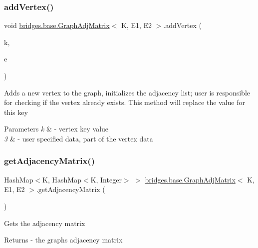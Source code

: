 \subsubsection{\texorpdfstring{addVertex()}{addVertex()}}
{\footnotesize\ttfamily void \mbox{\hyperlink{classbridges_1_1base_1_1_graph_adj_matrix}{bridges.\+base.\+Graph\+Adj\+Matrix}}$<$ K, E1, E2 $>$.add\+Vertex (\begin{DoxyParamCaption}\item[{K}]{k,  }\item[{E1}]{e }\end{DoxyParamCaption})}

Adds a new vertex to the graph, initializes the adjacency list; user is responsible for checking if the vertex already exists. This method will replace the value for this key


\begin{DoxyParams}{Parameters}
{\em k} & -\/ vertex key value \\
\hline
{\em 3} & -\/ user specified data, part of the vertex data \\
\hline
\end{DoxyParams}
\mbox{\label{classbridges_1_1base_1_1_graph_adj_matrix_abe7f26cb9874744bc044df18b5d0eb84}} 
\subsubsection{\texorpdfstring{getAdjacencyMatrix()}{getAdjacencyMatrix()}\hspace{0.1cm}{\footnotesize\ttfamily [1/2]}}
{\footnotesize\ttfamily Hash\+Map$<$K, Hash\+Map$<$K, Integer$>$ $>$ \mbox{\hyperlink{classbridges_1_1base_1_1_graph_adj_matrix}{bridges.\+base.\+Graph\+Adj\+Matrix}}$<$ K, E1, E2 $>$.get\+Adjacency\+Matrix (\begin{DoxyParamCaption}{ }\end{DoxyParamCaption})}

Gets the adjacency matrix

\begin{DoxyReturn}{Returns}
-\/ the graph\textquotesingle{}s adjacency matrix 
\end{DoxyReturn}
\mbox{\label{classbridges_1_1base_1_1_graph_adj_matrix_a43f830cfe126f2be351f6d8c2fccc569}} 
